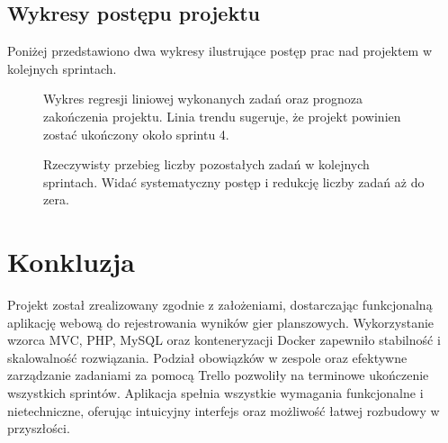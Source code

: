 \documentclass[12pt,a4paper]{article}
\begin{document}
\pagebreak
\subsection{Wykresy postępu projektu}
Poniżej przedstawiono dwa wykresy ilustrujące postęp prac nad projektem w kolejnych sprintach.

\begin{figure}[h]
	\centering
	\caption{Wykres regresji liniowej wykonanych zadań oraz prognoza zakończenia projektu. Linia trendu sugeruje, że projekt powinien zostać ukończony około sprintu 4.}
\end{figure}
\newpage
\begin{figure}[h]
	\centering
	\caption{Rzeczywisty przebieg liczby pozostałych zadań w kolejnych sprintach. Widać systematyczny postęp i redukcję liczby zadań aż do zera.}
\end{figure}

\section{Konkluzja}
Projekt został zrealizowany zgodnie z założeniami, dostarczając funkcjonalną aplikację webową do rejestrowania wyników gier planszowych. Wykorzystanie wzorca MVC, PHP, MySQL oraz konteneryzacji Docker zapewniło stabilność i skalowalność rozwiązania. Podział obowiązków w zespole oraz efektywne zarządzanie zadaniami za pomocą Trello pozwoliły na terminowe ukończenie wszystkich sprintów. Aplikacja spełnia wszystkie wymagania funkcjonalne i nietechniczne, oferując intuicyjny interfejs oraz możliwość łatwej rozbudowy w przyszłości.
\end{document}

